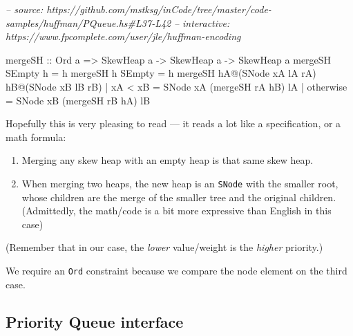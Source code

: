 \documentclass[]{article}
\newenvironment{Shaded}{}{}
\newcommand{\CommentTok}[1]{\textcolor[rgb]{0.38,0.63,0.69}{\textit{#1}}}
\newcommand{\DataTypeTok}[1]{\textcolor[rgb]{0.56,0.13,0.00}{#1}}
\newcommand{\FunctionTok}[1]{\textcolor[rgb]{0.02,0.16,0.49}{#1}}
\newcommand{\NormalTok}[1]{#1}
\newcommand{\OtherTok}[1]{\textcolor[rgb]{0.00,0.44,0.13}{#1}}
\begin{document}
\begin{Shaded}
\begin{Highlighting}[]
\CommentTok{-- source: https://github.com/mstksg/inCode/tree/master/code-samples/huffman/PQueue.hs#L37-L42}
\CommentTok{-- interactive: https://www.fpcomplete.com/user/jle/huffman-encoding}

\OtherTok{mergeSH ::} \DataTypeTok{Ord}\NormalTok{ a }\OtherTok{=>} \DataTypeTok{SkewHeap}\NormalTok{ a }\OtherTok{->} \DataTypeTok{SkewHeap}\NormalTok{ a }\OtherTok{->} \DataTypeTok{SkewHeap}\NormalTok{ a}
\NormalTok{mergeSH }\DataTypeTok{SEmpty}\NormalTok{ h }\FunctionTok{=}\NormalTok{ h}
\NormalTok{mergeSH h }\DataTypeTok{SEmpty} \FunctionTok{=}\NormalTok{ h}
\NormalTok{mergeSH hA}\FunctionTok{@}\NormalTok{(}\DataTypeTok{SNode}\NormalTok{ xA lA rA) hB}\FunctionTok{@}\NormalTok{(}\DataTypeTok{SNode}\NormalTok{ xB lB rB)}
    \FunctionTok{|}\NormalTok{ xA }\FunctionTok{<}\NormalTok{ xB    }\FunctionTok{=} \DataTypeTok{SNode}\NormalTok{ xA (mergeSH rA hB) lA}
    \FunctionTok{|}\NormalTok{ otherwise  }\FunctionTok{=} \DataTypeTok{SNode}\NormalTok{ xB (mergeSH rB hA) lB}
\end{Highlighting}
\end{Shaded}

Hopefully this is very pleasing to read --- it reads a lot like a specification,
or a math formula:

\begin{enumerate}
\def\labelenumi{\arabic{enumi}.}
\tightlist
\item
  Merging any skew heap with an empty heap is that same skew heap.
\item
  When merging two heaps, the new heap is an \texttt{SNode} with the smaller
  root, whose children are the merge of the smaller tree and the original
  children. (Admittedly, the math/code is a bit more expressive than English in
  this case)
\end{enumerate}

(Remember that in our case, the \emph{lower} value/weight is the \emph{higher}
priority.)

We require an \texttt{Ord} constraint because we compare the node element on the
third case.

\hypertarget{priority-queue-interface}{%
\subsection{Priority Queue interface}\label{priority-queue-interface}}
\end{document}
